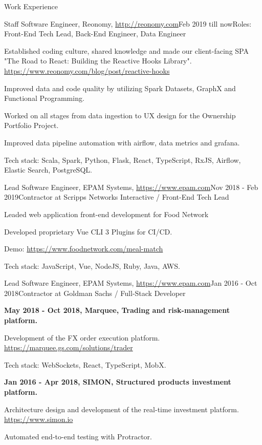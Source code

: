 \documentclass{resume}
\begin{document}
\begin{rSection}{Work Experience}

\begin{rSubsection}{Staff Software Engineer, Reonomy, \url{http://reonomy.com}}{Feb 2019 till now}{Roles: Front-End Tech Lead, Back-End Engineer, Data Engineer}{}
\item Established coding culture, shared knowledge 
and made our client-facing SPA
"The Road to React: Building the Reactive Hooks Library".
\url{https://www.reonomy.com/blog/post/reactive-hooks}
\item Improved data and code quality by utilizing Spark Datasets, GraphX and Functional Programming.
\item Worked on all stages from data ingestion to UX design for the Ownership Portfolio Project.
\item Improved data pipeline automation with airflow, data metrics and grafana.

Tech stack: Scala, Spark, Python, Flask, React, TypeScript, RxJS, Airflow, Elastic Search, PostgreSQL.
\end{rSubsection}

\begin{rSubsection}{Lead Software Engineer, EPAM Systems, \url{https://www.epam.com}}{Nov 2018 - Feb 2019}{Contractor at Scripps Networks Interactive / Front-End Tech Lead}{}
\item Leaded web application front-end development for Food Network
\item Developed proprietary Vue CLI 3 Plugins for CI/CD.

Demo: \url{https://www.foodnetwork.com/meal-match}

Tech stack: JavaScript, Vue, NodeJS, Ruby, Java, AWS.
\end{rSubsection}

\begin{rSubsection}{Lead Software Engineer, EPAM Systems, \url{https://www.epam.com}}{Jan 2016 - Oct 2018}{Contractor at Goldman Sachs / Full-Stack Developer}{}
\item[] \textbf{May 2018 - Oct 2018, Marquee, Trading and risk-management platform.}
\item Development of the FX order execution platform. \url{https://marquee.gs.com/solutions/trader}

Tech stack: WebSockets, React, TypeScript, MobX.

\item[] \textbf{Jan 2016 - Apr 2018, SIMON, Structured products investment platform.}
\item Architecture design and development of the real-time investment platform. \url{https://www.simon.io}
\item Automated end-to-end testing with Protractor.


\end{rSubsection}
\end{rSection}
\end{document}
